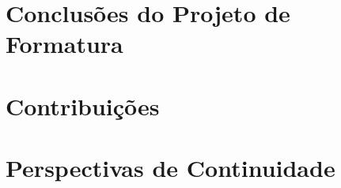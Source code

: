 \documentclass[]{politex}
\begin{document}
\section{Conclusões do Projeto de Formatura}
\section{Contribuições}
\section{Perspectivas de Continuidade}



%

%
\end{document}
